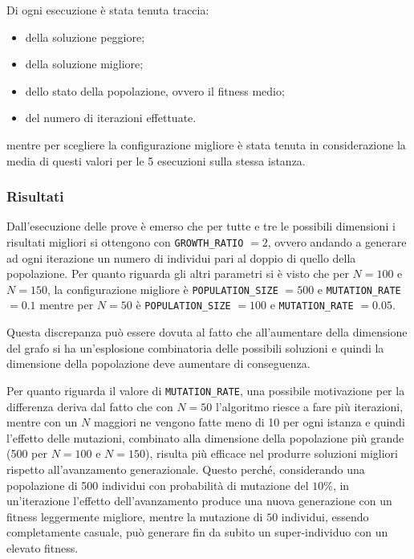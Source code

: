 Di ogni esecuzione è stata tenuta traccia:
\begin{itemize}
	\item della soluzione peggiore;
	\item della soluzione migliore;
	\item dello stato della popolazione, ovvero il fitness medio;
	\item del numero di iterazioni effettuate.
\end{itemize}

mentre per scegliere la configurazione migliore è stata tenuta in considerazione la media di questi valori per le 5 esecuzioni sulla stessa istanza.

\subsubsection{Risultati}

Dall'esecuzione delle prove è emerso che per tutte e tre le possibili dimensioni i risultati migliori si ottengono con \texttt{GROWTH\_RATIO} $= 2$, ovvero andando a generare ad ogni iterazione un numero di individui pari al doppio di quello della popolazione. 
Per quanto riguarda gli altri parametri si è visto che per $N = 100$ e $N = 150$, la configurazione migliore è \texttt{POPULATION\_SIZE} $ = 500$  e \texttt{MUTATION\_RATE} $ = 0.1$ mentre per $N=50$ è \texttt{POPULATION\_SIZE} $ = 100$ e \texttt{MUTATION\_RATE} $ = 0.05$. 

Questa discrepanza può essere dovuta al fatto che all'aumentare della dimensione del grafo si ha un'esplosione combinatoria delle possibili soluzioni e quindi la dimensione della popolazione deve aumentare di conseguenza.

Per quanto riguarda il valore di \texttt{MUTATION\_RATE}, una possibile motivazione per la differenza deriva dal fatto che con $N=50$ l'algoritmo riesce a fare più iterazioni, mentre con un $N$ maggiori ne vengono fatte meno di 10 per ogni istanza e quindi l'effetto delle mutazioni, combinato alla dimensione della popolazione più grande (500 per $N=100$ e $N=150$), risulta più efficace nel produrre soluzioni migliori rispetto all'avanzamento generazionale. 
Questo perché, considerando una popolazione di 500 individui con probabilità di mutazione del $10\%$, in un'iterazione l'effetto dell'avanzamento produce una nuova generazione con un fitness leggermente migliore, mentre la mutazione di $50$ individui, essendo completamente casuale, può generare fin da subito un super-individuo con un elevato fitness.


